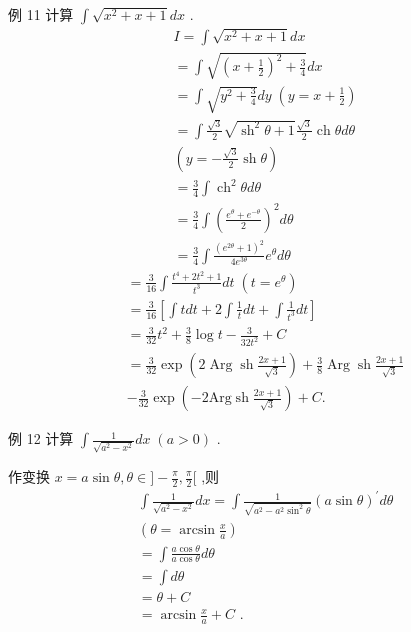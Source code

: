 例 11 计算 $\int \sqrt{{x}^{2} + x + 1}{dx}$ .
\begin{align*}
	&I = \int \sqrt{{x}^{2} + x + 1}{dx}\\
	&= \int \sqrt{{\left( x + \frac{1}{2}\right) }^{2} + \frac{3}{4}}{dx}\\
	&= \int \sqrt{{y}^{2} + \frac{3}{4}}{dy}\;\left( {y = x + \frac{1}{2}}\right)\\
	&= \int \frac{\sqrt{3}}{2}\sqrt{{\operatorname{sh}}^{2}\theta  + 1}\frac{\sqrt{3}}{2}\operatorname{ch}{\theta d\theta }\\
	&\left( {y =  - \frac{\sqrt{3}}{2}\operatorname{sh}\theta }\right)\\
	&= \frac{3}{4}\int {\operatorname{ch}}^{2}{\theta d\theta }\\
	&= \frac{3}{4}\int {\left( \frac{{e}^{\theta } + {e}^{-\theta }}{2}\right) }^{2}{d\theta }\\
	&= \frac{3}{4}\int \frac{{\left( {e}^{2\theta } + 1\right) }^{2}}{4{e}^{3\theta }}{e}^{\theta }{d\theta }
\end{align*}
\begin{align*}
	&= \frac{3}{16}\int \frac{{t}^{4} + 2{t}^{2} + 1}{{t}^{3}}{dt}\;\left( {t = {e}^{\theta }}\right)\\
	&= \frac{3}{16}\left\lbrack  {\int {tdt} + 2\int \frac{1}{t}{dt} + \int \frac{1}{{t}^{3}}{dt}}\right\rbrack\\
	&= \frac{3}{32}{t}^{2} + \frac{3}{8}\log t - \frac{3}{{32}{t}^{2}} + C\\
	&= \frac{3}{32}\exp \left( {2\operatorname{Arg}\operatorname{sh}\frac{{2x} + 1}{\sqrt{3}}}\right)  + \frac{3}{8}\operatorname{Arg}\operatorname{sh}\frac{{2x} + 1}{\sqrt{3}}\\
	&- \frac{3}{32}\exp \left( {-2\mathrm{{Arg}}\operatorname{sh}\frac{{2x} + 1}{\sqrt{3}}}\right)  + C.
\end{align*}

例 12 计算 $\int \frac{1}{\sqrt{{a}^{2} - {x}^{2}}}{dx}\;\left( {a > 0}\right)$ .

作变换 $x = a\sin \theta ,\theta  \in  \rbrack  - \frac{\pi }{2},\frac{\pi }{2}\lbrack$ ,则
\begin{align*}
	&\int \frac{1}{\sqrt{{a}^{2} - {x}^{2}}}{dx} = \int \frac{1}{\sqrt{{a}^{2} - {a}^{2}{\sin }^{2}\theta }}{\left( a\sin \theta \right) }^{\prime }{d\theta }\\
	&\left( {\theta  = \arcsin \frac{x}{a}}\right)\\
	&= \int \frac{a\cos \theta }{a\cos \theta }{d\theta }\\
	&= \int {d\theta }\\
	&= \theta  + C\\
	&= \arcsin \frac{x}{a} + C\text{ . }
\end{align*}


